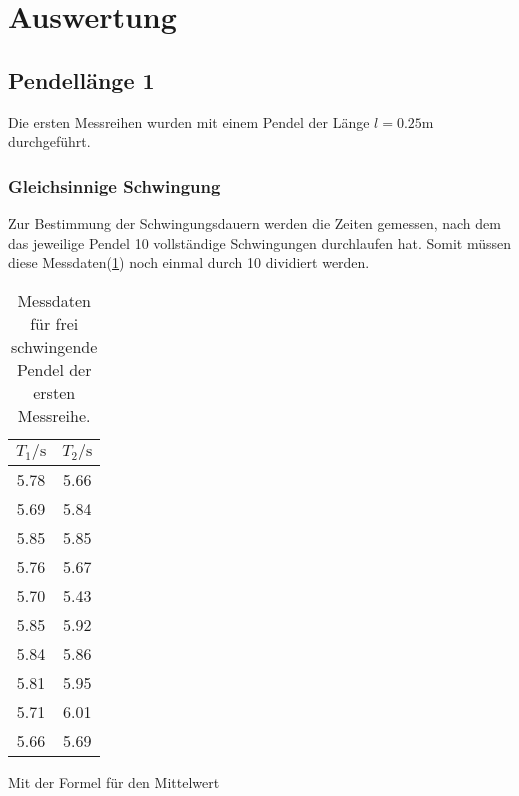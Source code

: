 \newpage
\section{Auswertung}

    \subsection{Pendellänge 1}

        \noindent Die ersten Messreihen wurden mit einem Pendel der Länge $l = 0.25 \si{\m}$ durchgeführt.

        \subsubsection{Gleichsinnige Schwingung}

            \noindent Zur Bestimmung der Schwingungsdauern werden die Zeiten gemessen, nach dem das jeweilige Pendel 10 vollständige Schwingungen 
            durchlaufen hat. Somit müssen diese Messdaten(\ref{tab:frei1}) noch einmal durch 10 dividiert werden.

            \begin{table}[ht]
                \centering
                \caption{Messdaten für frei schwingende Pendel der ersten Messreihe.}
                \label{tab:frei1}
                \begin{tabular}{c c}
                 \toprule
                 $T_1 / \si{\s}$ & $T_2 / \si{\s}$\\
                 \midrule
                 5.78  &  5.66 \\
                 5.69  &  5.84 \\
                 5.85  &  5.85 \\
                 5.76  &  5.67 \\
                 5.70  &  5.43 \\
                 5.85  &  5.92 \\
                 5.84  &  5.86 \\
                 5.81  &  5.95 \\
                 5.71  &  6.01 \\
                 5.66  &  5.69 \\
                 \bottomrule
                \end{tabular}
            \end{table}

            \noindent Mit der Formel für den Mittelwert 

